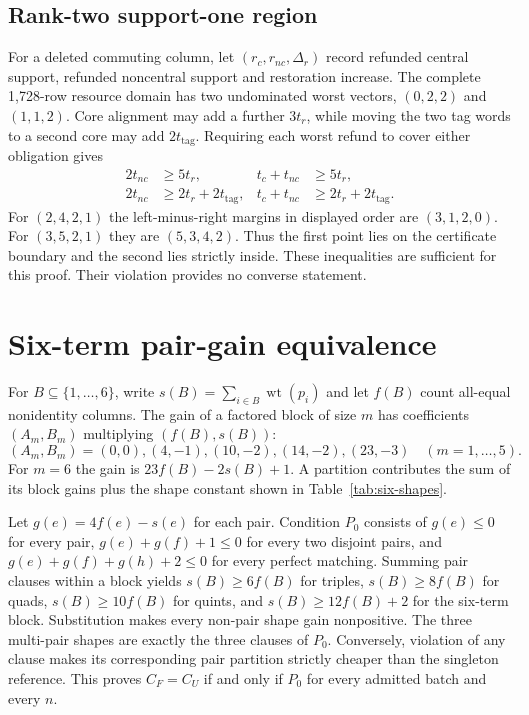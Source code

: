 \documentclass[a4paper,onecolumn,11pt,unpublished,noarxiv]{quantumarticle}
\begin{document}
\subsection{Rank-two support-one region}

For a deleted commuting column, let $(r_c,r_{nc},\Delta_r)$ record refunded central support, refunded noncentral support and restoration increase.  The complete 1,728-row resource domain has two undominated worst vectors, $(0,2,2)$ and $(1,1,2)$.  Core alignment may add a further $3t_r$, while moving the two tag words to a second core may add $2t_{\mathrm{tag}}$.  Requiring each worst refund to cover either obligation gives
\begin{align}
2t_{nc}&\ge5t_r,&t_c+t_{nc}&\ge5t_r,\\
2t_{nc}&\ge2t_r+2t_{\mathrm{tag}},&t_c+t_{nc}&\ge2t_r+2t_{\mathrm{tag}}.
\end{align}
For $(2,4,2,1)$ the left-minus-right margins in displayed order are $(3,1,2,0)$.  For $(3,5,2,1)$ they are $(5,3,4,2)$.  Thus the first point lies on the certificate boundary and the second lies strictly inside.  These inequalities are sufficient for this proof.  Their violation provides no converse statement.

\section{Six-term pair-gain equivalence}\label{sec:six-proof}

For $B\subseteq\{1,\ldots,6\}$, write $s(B)=\sum_{i\in B}\operatorname{wt}(p_i)$ and let $f(B)$ count all-equal nonidentity columns.  The gain of a factored block of size $m$ has coefficients $(A_m,B_m)$ multiplying $(f(B),s(B))$:
\begin{equation}
(A_m,B_m)=(0,0),(4,-1),(10,-2),(14,-2),(23,-3)\quad(m=1,\ldots,5).
\end{equation}
For $m=6$ the gain is $23f(B)-2s(B)+1$.  A partition contributes the sum of its block gains plus the shape constant shown in Table~\ref{tab:six-shapes}.

Let $g(e)=4f(e)-s(e)$ for each pair.  Condition $P_0$ consists of $g(e)\le0$ for every pair, $g(e)+g(f)+1\le0$ for every two disjoint pairs, and $g(e)+g(f)+g(h)+2\le0$ for every perfect matching.  Summing pair clauses within a block yields $s(B)\ge6f(B)$ for triples, $s(B)\ge8f(B)$ for quads, $s(B)\ge10f(B)$ for quints, and $s(B)\ge12f(B)+2$ for the six-term block.  Substitution makes every non-pair shape gain nonpositive.  The three multi-pair shapes are exactly the three clauses of $P_0$.  Conversely, violation of any clause makes its corresponding pair partition strictly cheaper than the singleton reference.  This proves $C_F=C_U$ if and only if $P_0$ for every admitted batch and every $n$.
\end{document}

